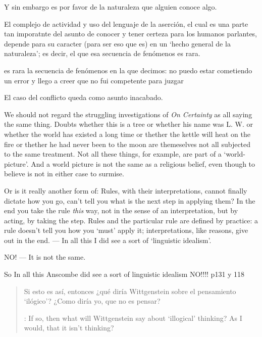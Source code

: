   Y sin embargo es por favor de la naturaleza que alguien conoce algo.

  El complejo de actividad y uso del lenguaje de la aserción, el cual es una parte tan imporatnte del asunto de conocer y tener certeza para los humanos parlantes, depende para su caracter (para ser eso que es) en un `hecho general de la naturaleza'; es decir, el que esa secuencia de fenómenos es rara.

  es rara la secuencia de fenómenos en la que decimos: no puedo estar cometiendo un error y llego a creer que no fui competente para juzgar


  El caso del conflicto queda como asunto inacabado.











  We should not regard the struggling investigations of \emph{On Certainty} as all saying the same thing. Doubts whether this is a tree or whether his name was L. W. or whether the world has existed a long time or thether the kettle will heat on the fire or thether he had never been to the moon are themeselves not all subjected to the same treatment. Not all these things, for example, are part of a `world-picture'. And a world picture is not the same as a religious belief, even though to believe is not in either case to surmise.

Or is it really another form of:
Rules, with their interpretations, cannot finally dictate how you go, can't tell you what is the next step in applying them? In the end you take the rule \emph{this} way, not in the sense of an interpretation, but by acting, by taking the step. Rules and the particular rule are defined by practice: a rule doesn't tell you how you `must' apply it; interpretations, like reasons, give out in the end. --- In all this I did see a sort of `linguistic idealism'.

NO! --- It is not the same.


So In all this Anscombe did see a sort of linguistic idealism NO!!!! p131 y 118

\blockquote[{\cite[122]{anscombe1981parmenides:qli}}: If so, then what will Wittgenstein say about `illogical' thinking? As I would, that it isn't thinking?]{Si esto es así, entonces ¿qué diría Wittgenstein sobre el pensamiento `ilógico'? ¿Como diría yo, que no es pensar?}

